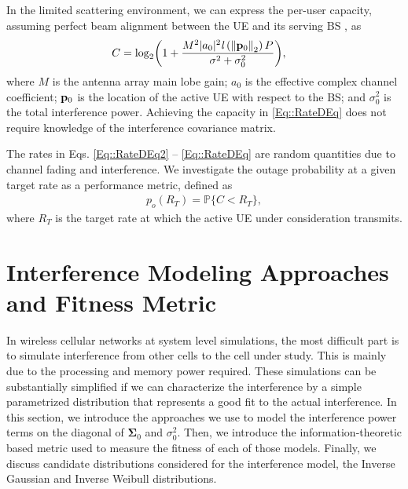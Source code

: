 \documentclass[12pt, draftclsnofoot, onecolumn]{IEEEtran}
\theoremstyle{plain}
\begin{document}
In the limited scattering environment, we can express the per-user capacity, assuming perfect beam alignment between the UE and its serving BS \cite{BaiH14}, as
\begin{align}\label{Eq::RateDEq}
\!\!\!\!\!\!C=  {\color{black}\log_2}{\left( 1 + \frac{M^2  |a_0|^2 \mathit{l}\left({\Vert \bold{p}_0 \Vert}_2\right) P}{\sigma^2 + \sigma_0^2} \right)},
\end{align}
{where $M$ is the antenna array main lobe gain; $a_0$ is the effective complex channel coefficient; $\bold{p}_0$ is the location of the active UE with respect to the BS; and $\sigma_0^2$ is the total interference power. Achieving the capacity in \eqref{Eq::RateDEq} does not require knowledge of the interference covariance matrix.}

The rates in Eqs. \eqref{Eq::RateDEq2} -- \eqref{Eq::RateDEq} are random quantities due to channel fading and interference. 
%
We investigate the outage probability at a given target rate as a performance metric, defined as 
%
%
\begin{eqnarray}\label{OutageEquation}
p_o(R_T)= \mathbb{P}\{C  < R_T\},
\end{eqnarray}
where $R_T$ is the {\color{black}target} rate at which the active UE under consideration transmits.
\vspace{-0.1in}
\section{Interference Modeling Approaches and Fitness Metric}\label{secAnalyse}
In wireless cellular networks at system level simulations, the most difficult part is to simulate interference from other cells to the cell under study. This is mainly due to the processing and memory power required. These simulations can be substantially simplified if we can characterize the interference by a simple parametrized distribution that represents a good fit to the actual interference. In this section, we introduce the approaches we use to model the interference power terms on the diagonal of $\boldsymbol{\Sigma}_{0}$ {\color{black}and ${\sigma}_{0}^2$}. Then, we introduce the information-theoretic based metric used to measure the fitness of each of those models. Finally, we discuss candidate distributions considered for the interference model, the {Inverse Gaussian and Inverse Weibull} distributions.
%
\vspace{-.1in}
\end{document}
